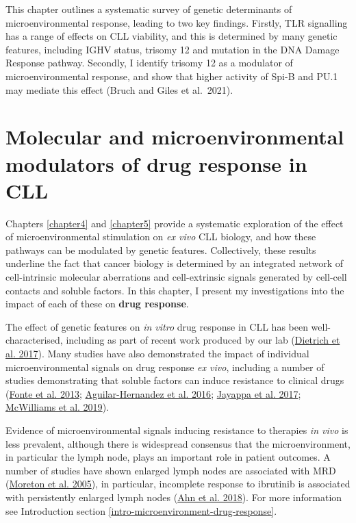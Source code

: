 \documentclass[11pt, a4paper, twosided]{book}
\begin{document}
This chapter outlines a systematic survey of genetic determinants of microenvironmental response, leading to two key findings. Firstly, TLR signalling has a range of effects on CLL viability, and this is determined by many genetic features, including IGHV status, trisomy 12 and mutation in the DNA Damage Response pathway. Secondly, I identify trisomy 12 as a modulator of microenvironmental response, and show that higher activity of Spi-B and PU.1 may mediate this effect (Bruch and Giles et al.~2021).

\hypertarget{chapter6}{%
\chapter{Molecular and microenvironmental modulators of drug response in CLL}\label{chapter6}}

Chapters \ref{chapter4} and \ref{chapter5} provide a systematic exploration of the effect of microenvironmental stimulation on \emph{ex vivo} CLL biology, and how these pathways can be modulated by genetic features. Collectively, these results underline the fact that cancer biology is determined by an integrated network of cell-intrinsic molecular aberrations and cell-extrinsic signals generated by cell-cell contacts and soluble factors. In this chapter, I present my investigations into the impact of each of these on \textbf{drug response}.

The effect of genetic features on \emph{in vitro} drug response in CLL has been well-characterised, including as part of recent work produced by our lab (\protect\hyperlink{ref-JCIpaper}{Dietrich et al. 2017}). Many studies have also demonstrated the impact of individual microenvironmental signals on drug response \emph{ex vivo}, including a number of studies demonstrating that soluble factors can induce resistance to clinical drugs (\protect\hyperlink{ref-Fonte2013}{Fonte et al. 2013}; \protect\hyperlink{ref-AguilarHernandez2016}{Aguilar-Hernandez et al. 2016}; \protect\hyperlink{ref-Jayappa2017}{Jayappa et al. 2017}; \protect\hyperlink{ref-McWilliams2019}{McWilliams et al. 2019}).

Evidence of microenvironmental signals inducing resistance to therapies \emph{in vivo} is less prevalent, although there is widespread consensus that the microenvironment, in particular the lymph node, plays an important role in patient outcomes. A number of studies have shown enlarged lymph nodes are associated with MRD (\protect\hyperlink{ref-Moreton2005}{Moreton et al. 2005}), in particular, incomplete response to ibrutinib is associated with persistently enlarged lymph nodes (\protect\hyperlink{ref-Ahn2018}{Ahn et al. 2018}). For more information see Introduction section \ref{intro-microenvironment-drug-response}.
\end{document}
